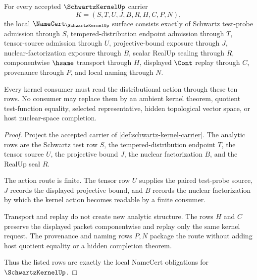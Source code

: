 \begin{theorem}
\label{thm:schwartz-kernel-namecert-obligations}
For every accepted $\SchwartzKernelUp$ carrier
$$
K=(S,T,U,J,B,R,H,C,P,N),
$$
the local $\NameCert_{\SchwartzKernelUp}$ surface consists exactly of Schwartz test-probe admission through $S$, tempered-distribution endpoint admission through $T$, tensor-source admission through $U$, projective-bound exposure through $J$, nuclear-factorization exposure through $B$, scalar RealUp sealing through $R$, componentwise $\hsame$ transport through $H$, displayed $\Cont$ replay through $C$, provenance through $P$, and local naming through $N$.

Every kernel consumer must read the distributional action through these ten rows. No consumer may replace them by an ambient kernel theorem, quotient test-function equality, selected representative, hidden topological vector space, or host nuclear-space completion.
\end{theorem}
\begin{proof}
Project the accepted carrier of \autoref{def:schwartz-kernel-carrier}. The analytic rows are the Schwartz test row $S$, the tempered-distribution endpoint $T$, the tensor source $U$, the projective bound $J$, the nuclear factorization $B$, and the RealUp seal $R$.

The action route is finite. The tensor row $U$ supplies the paired test-probe source, $J$ records the displayed projective bound, and $B$ records the nuclear factorization by which the kernel action becomes readable by a finite consumer.

Transport and replay do not create new analytic structure. The rows $H$ and $C$ preserve the displayed packet componentwise and replay only the same kernel request. The provenance and naming rows $P,N$ package the route without adding host quotient equality or a hidden completion theorem.

Thus the listed rows are exactly the local NameCert obligations for $\SchwartzKernelUp$.
\end{proof}

